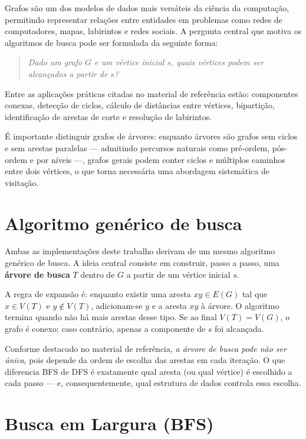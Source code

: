 \documentclass[12pt,a4paper]{article}
\begin{document}
Grafos são um dos modelos de dados mais versáteis da ciência da computação,
permitindo representar relações entre entidades em problemas como redes de
computadores, mapas, labirintos e redes sociais. A pergunta central que motiva
os algoritmos de busca pode ser formulada da seguinte forma:

\begin{quote}
\textit{Dado um grafo $G$ e um vértice inicial $s$, quais vértices podem
ser alcançados a partir de $s$?}
\end{quote}

Entre as aplicações práticas citadas no material de referência estão:
componentes conexas, detecção de ciclos, cálculo de distâncias entre vértices,
bipartição, identificação de arestas de corte e resolução de labirintos.

É importante distinguir grafos de árvores: enquanto árvores são grafos sem
ciclos e sem arestas paralelas --- admitindo percursos naturais como pré-ordem,
pós-ordem e por níveis ---, grafos gerais podem conter ciclos e múltiplos
caminhos entre dois vértices, o que torna necessária uma abordagem sistemática
de visitação.

\section{Algoritmo genérico de busca}

Ambas as implementações deste trabalho derivam de um mesmo algoritmo genérico
de busca. A ideia central consiste em construir, passo a passo, uma
\textbf{árvore de busca} $T$ dentro de $G$ a partir de um vértice inicial $s$.

A regra de expansão é: enquanto existir uma aresta $xy \in E(G)$ tal que
$x \in V(T)$ e $y \notin V(T)$, adicionam-se $y$ e a aresta $xy$ à árvore.
O algoritmo termina quando não há mais arestas desse tipo. Se ao final
$V(T) = V(G)$, o grafo é conexo; caso contrário, apenas a componente de $s$
foi alcançada.

Conforme destacado no material de referência, \textit{a árvore de busca pode
não ser única}, pois depende da ordem de escolha das arestas em cada iteração.
O que diferencia BFS de DFS é exatamente qual aresta (ou qual vértice) é
escolhido a cada passo --- e, consequentemente, qual estrutura de dados controla
essa escolha.

\section{Busca em Largura (BFS)}
\end{document}
